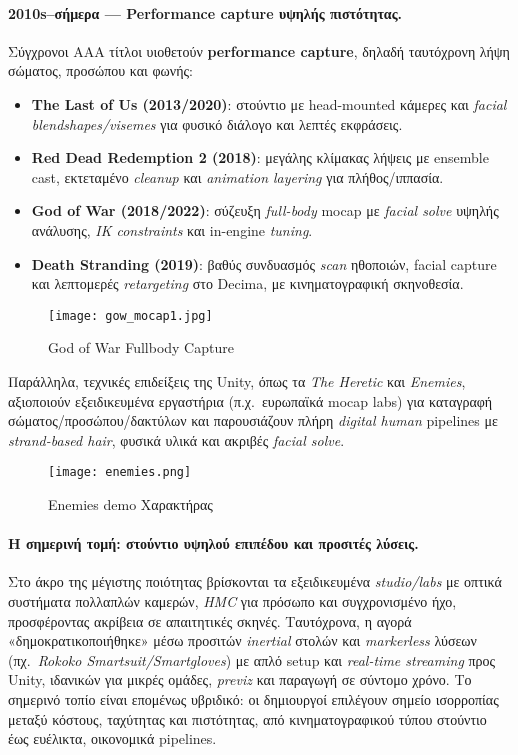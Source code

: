 \paragraph{2010s–σήμερα — Performance capture υψηλής πιστότητας.}
Σύγχρονοι AAA τίτλοι υιοθετούν \textbf{performance capture}, δηλαδή ταυτόχρονη λήψη σώματος, προσώπου και φωνής:
\begin{itemize}
  \item \textbf{The Last of Us (2013/2020)}: στούντιο με head-mounted κάμερες και \textit{facial blendshapes/visemes} για φυσικό διάλογο και λεπτές εκφράσεις.
  \item \textbf{Red Dead Redemption 2 (2018)}: μεγάλης κλίμακας λήψεις με ensemble cast, εκτεταμένο \textit{cleanup} και \textit{animation layering} για πλήθος/ιππασία.
  \item \textbf{God of War (2018/2022)}: σύζευξη \textit{full-body} mocap με \textit{facial solve} υψηλής ανάλυσης, \textit{IK constraints} και in-engine \textit{tuning}.
  \item \textbf{Death Stranding (2019)}: βαθύς συνδυασμός \textit{scan} ηθοποιών, facial capture και λεπτομερές \textit{retargeting} στο Decima, με κινηματογραφική σκηνοθεσία.
\end{itemize}

\begin{figure} [H]
    \centering
    \texttt{[image: gow\_mocap1.jpg]}
    \caption{God of War Fullbody Capture}
    \label{fig:placeholder}
\end{figure}

Παράλληλα, τεχνικές επιδείξεις της Unity, όπως τα \textit{The Heretic} και \textit{Enemies}, αξιοποιούν εξειδικευμένα εργαστήρια (π.χ.\ ευρωπαϊκά mocap labs) για καταγραφή σώματος/προσώπου/δακτύλων και παρουσιάζουν πλήρη \textit{digital human} pipelines με \textit{strand-based hair}, φυσικά υλικά και ακριβές \textit{facial solve}.

\begin{figure}[H]
    \centering
    \texttt{[image: enemies.png]}
    \caption{Enemies demo Χαρακτήρας}
    \label{fig:placeholder}
\end{figure}

\paragraph{Η σημερινή τομή: στούντιο υψηλού επιπέδου και προσιτές λύσεις.}
Στο άκρο της μέγιστης ποιότητας βρίσκονται τα εξειδικευμένα \textit{studio/labs} με οπτικά συστήματα πολλαπλών καμερών, \textit{HMC} για πρόσωπο και συγχρονισμένο ήχο, προσφέροντας  ακρίβεια σε απαιτητικές σκηνές. Ταυτόχρονα, η αγορά «δημοκρατικοποιήθηκε» μέσω προσιτών \textit{inertial} στολών και \textit{markerless} λύσεων (πχ.\ \textit{Rokoko Smartsuit/Smartgloves}) με απλό setup και \textit{real-time streaming} προς Unity, ιδανικών για μικρές ομάδες, \textit{previz} και παραγωγή σε σύντομο χρόνο. Το σημερινό τοπίο είναι επομένως υβριδικό: οι δημιουργοί επιλέγουν σημείο ισορροπίας μεταξύ κόστους, ταχύτητας και πιστότητας, από κινηματογραφικού τύπου στούντιο έως ευέλικτα, οικονομικά pipelines.

